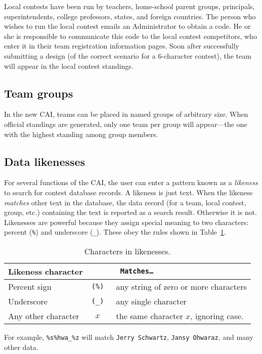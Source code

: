 \documentclass[11pt,letterpaper]{refart}
\def\nada{\hspace{0pt}}
\begin{document}
Local contests have been run by teachers, home-school parent groups, 
principals, superintendents, college professors, states, and foreign countries.
The person who wishes to run the local contest emails an Administrator to 
obtain a code.  He or she is responsible to 
communicate this code to the local contest competitors, who enter it in their
team registration information pages.  Soon after successfully
submitting a design (of the correct scenario for a 6-character contest), 
the team will appear in the local contest standings.

\subsection{Team groups}
In the new CAI, teams can be placed in named groups of arbitrary size.  When
official standings are generated, only one team per group will appear---the
one with the highest standing among group members.

\subsection{Data likenesses}
For several functions of the CAI, the user can enter a pattern known as a \emph{likeness}
to search for contest database records. A likeness is just text.  When the likeness
\emph{matches} other text in the database, the data record (for a team, local contest,
group, etc.) containing the text is reported as a search result.  Otherwise it is not.  
Likenesses are powerful because they assign special meaning to two characters:
percent (\texttt{\%}) and underscore (\texttt{\_}). These obey the rules shown in
Table~\ref{tbl:likeness}.\
\begin{table}
\centering
\caption{Characters in likenesses.}
\begin{tabular}{l>{\tt}cl}
\multicolumn{2}{l}{\bfseries Likeness character} & {\bfseries Matches\ldots} \\ \hline
Percent sign & (\texttt{\%}\nada) & any string of zero or more characters \\
Underscore  & (\texttt{\_}\nada)  & any single character \\
Any other character & $x$ & the same character $x$, ignoring case.
\end{tabular}
\label{tbl:likeness}
\end{table}

For example, \texttt{\%s\%hwa\_\%z} will match \texttt{Jerry Schwartz},
\texttt{Jansy Ohwaraz}, and many other data.
\end{document}
